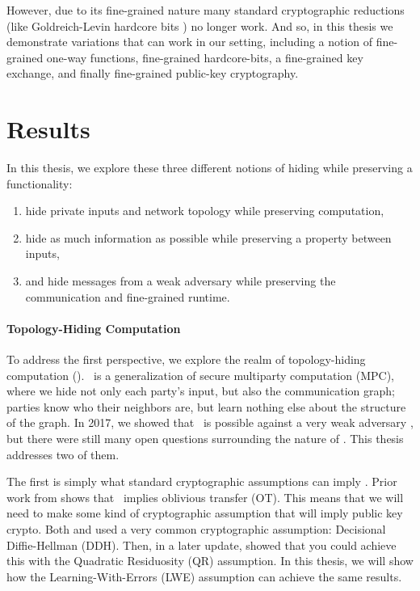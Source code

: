 However, due to its fine-grained nature many standard cryptographic reductions (like Goldreich-Levin hardcore bits \cite{hardCoreBitsAndXorLemmaFromGL}) no longer work. And so, in this thesis we demonstrate variations that can work in our setting, including a notion of fine-grained one-way functions, fine-grained hardcore-bits, a fine-grained key exchange, and finally fine-grained public-key cryptography.

\section{Results}
In this thesis, we explore these three different notions of hiding while preserving a functionality:

\begin{enumerate}
	\item hide private inputs and network topology while preserving computation,

	\item hide as much information as possible while preserving a property between inputs,

	\item and hide messages from a weak adversary while preserving the communication and fine-grained runtime.
\end{enumerate}


\paragraph{Topology-Hiding Computation}
To address the first perspective, we explore the realm of topology-hiding computation (\THC). \THC~is a generalization of secure multiparty computation (MPC), where we hide not only each party's input, but also the communication graph; parties know who their neighbors are, but learn nothing else about the structure of the graph. In 2017, we showed that \THC~is possible against a very weak adversary \cite{ALM17}, but there were still many open questions surrounding the nature of \THC. This thesis addresses two of them.

The first is simply what standard cryptographic assumptions can imply \THC. Prior work from \cite{BBMM18} shows that \THC~implies oblivious transfer (OT). This means that we will need to make some kind of cryptographic assumption that will imply public key crypto. Both \cite{EC:AkaMor17} and \cite{ALM17} used a very common cryptographic assumption: Decisional Diffie-Hellman (DDH). Then, in a later update, \cite{EPRINT:AkaLaVMor17} showed that you could achieve this with the Quadratic Residuosity (QR) assumption. In this thesis, we will show how the Learning-With-Errors (LWE) assumption can achieve the same results.

